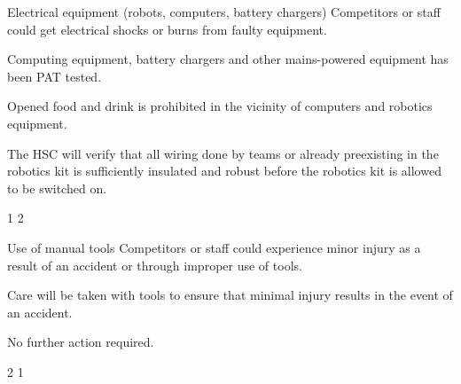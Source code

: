{    \risk
        {Electrical equipment (robots, computers, battery chargers)}
        {Competitors or staff could get electrical shocks or burns from faulty
         equipment.}
        {\item Computing equipment, battery chargers and other mains-powered
         equipment has been PAT tested.
         \item Opened food and drink is prohibited in the vicinity of
         computers and robotics equipment.}
        {\item The HSC will verify that all wiring done by teams or already
         preexisting in the robotics kit is sufficiently insulated and robust
         before the robotics kit is allowed to be switched on.}
        {1} %
        {2} %

    \risk
        {Use of manual tools}
        {Competitors or staff could experience minor injury as a result of an
         accident or through improper use of tools.}
        {\item Care will be taken with tools to ensure that minimal injury
         results in the event of an accident.}
        {\item No further action required.}
        {2} %
        {1} %
}


\newcommand{\postrisks}{
    \subsection*{Risk of fire}

    To minimise the risk of fire resulting from this activity, food and drink
    will not be allowed near electrical equipment, and naked flames will be
    prohibited. The risk of fire occurring elsewhere in the building(s) is
    controlled primarily by the building operator\estatesfacilitiesfootnote.
    The HSC will ensure that all people present are informed of the
    locations of the exits and whether any fire drills are expected to take
    place. Should a fire break out (or any other event requiring evacuation),
    all people are to evacuate through the nearest accessible exit.
}



